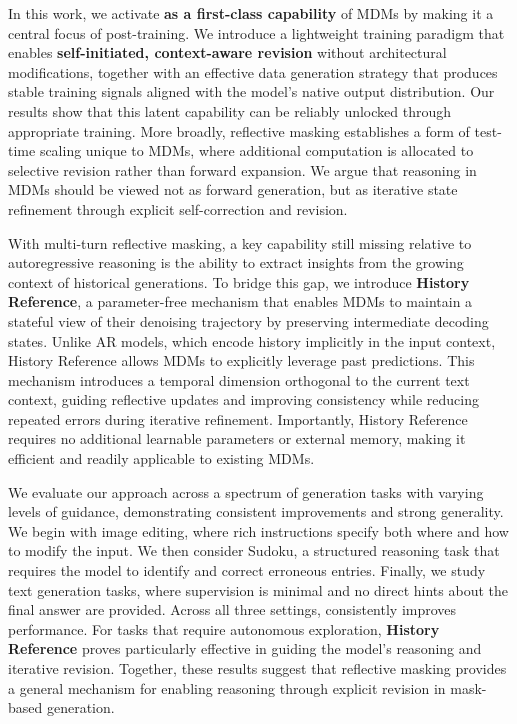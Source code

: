 In this work, we activate \textbf{\methodfull as a first-class capability} of MDMs by making it a central focus of post-training. We introduce a lightweight training paradigm that enables \textbf{self-initiated, context-aware revision} without architectural modifications, together with an effective data generation strategy that produces stable training signals aligned with the model’s native output distribution. Our results show that this latent capability can be reliably unlocked through appropriate training. More broadly, reflective masking establishes a form of test-time scaling unique to MDMs, where additional computation is allocated to selective revision rather than forward expansion. We argue that reasoning in MDMs should be viewed not as forward generation, but as iterative state refinement through explicit self-correction and revision.

With multi-turn reflective masking, a key capability still missing relative to autoregressive reasoning is the ability to extract insights from the growing context of historical generations. To bridge this gap, we introduce \textbf{History Reference}, a parameter-free mechanism that enables MDMs to maintain a stateful view of their denoising trajectory by preserving intermediate decoding states. Unlike AR models, which encode history implicitly in the input context, History Reference allows MDMs to explicitly leverage past predictions. This mechanism introduces a temporal dimension orthogonal to the current text context, guiding reflective updates and improving consistency while reducing repeated errors during iterative refinement. Importantly, History Reference requires no additional learnable parameters or external memory, making it efficient and readily applicable to existing MDMs.

We evaluate our approach across a spectrum of generation tasks with varying levels of guidance, demonstrating consistent improvements and strong generality. We begin with image editing, where rich instructions specify both where and how to modify the input. We then consider Sudoku, a structured reasoning task that requires the model to identify and correct erroneous entries. Finally, we study text generation tasks, where supervision is minimal and no direct hints about the final answer are provided. Across all three settings, \textbf{\methodfull} consistently improves performance. For tasks that require autonomous exploration, \textbf{History Reference} proves particularly effective in guiding the model’s reasoning and iterative revision. Together, these results suggest that reflective masking provides a general mechanism for enabling reasoning through explicit revision in mask-based generation. 


